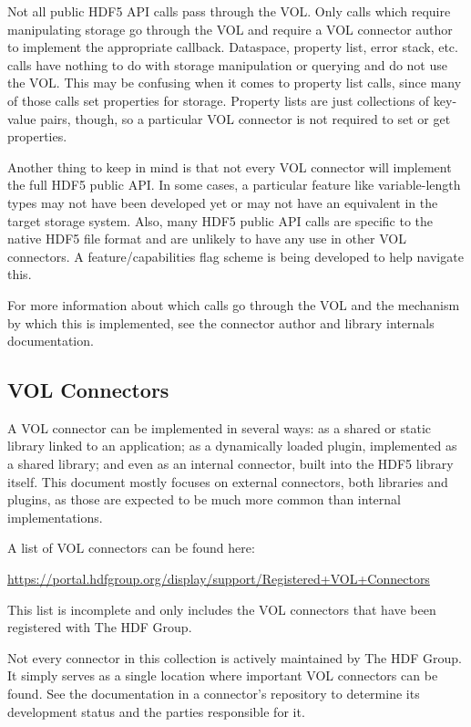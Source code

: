 Not all public HDF5 API calls pass through the VOL. Only calls which require manipulating storage go through the VOL and require a VOL connector author to implement the appropriate callback. Dataspace, property list, error stack, etc. calls have nothing to do with storage manipulation or querying and do not use the VOL. This may be confusing when it comes to property list calls, since many of those calls set properties for storage. Property lists are just collections of key-value pairs, though, so a particular VOL connector is not required to set or get properties.

Another thing to keep in mind is that not every VOL connector will implement the full HDF5 public API. In some cases, a particular feature like variable-length types may not have been developed yet or may not have an equivalent in the target storage system. Also, many HDF5 public API calls are specific to the native HDF5 file format and are unlikely to have any use in other VOL connectors. A feature/capabilities flag scheme is being developed to help navigate this.

For more information about which calls go through the VOL and the mechanism by which this is implemented, see the connector author and library internals documentation.

\subsection{VOL Connectors}

A VOL connector can be implemented in several ways: as a shared or static library linked to an application; as a dynamically loaded plugin, implemented as a shared library; and even as an internal connector, built into the HDF5 library itself. This document mostly focuses on external connectors, both libraries and plugins, as those are expected to be much more common than internal implementations.

A list of VOL connectors can be found here:

\url{https://portal.hdfgroup.org/display/support/Registered+VOL+Connectors}

This list is incomplete and only includes the VOL connectors that have been registered with The HDF Group.

Not every connector in this collection is actively maintained by The HDF Group. It simply serves as a single location where important VOL connectors can be found. See the documentation in a connector's repository to determine its development status and the parties responsible for it.

